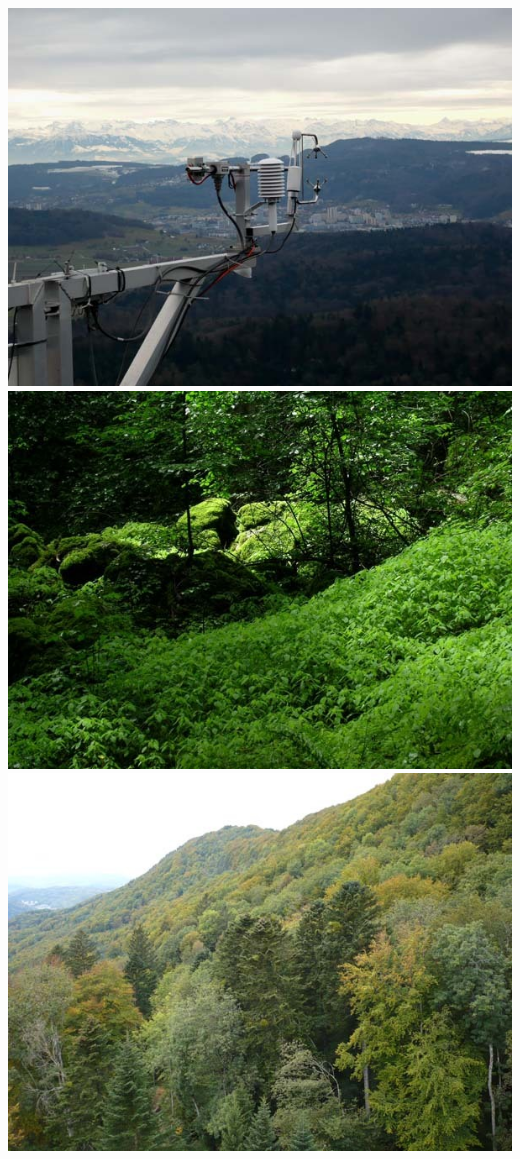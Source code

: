 \documentclass[
]{book}
\begin{document}
\includegraphics{./figures/site1.jpg}
\includegraphics{./figures/site2.jpg}
\includegraphics{./figures/site3.jpg}
\end{document}
